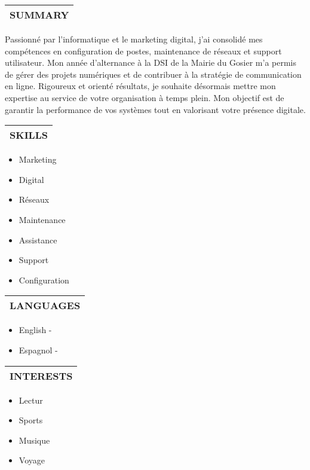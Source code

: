 \documentclass{article}
\makeatletter
\newcommand{\cvsection}[1]{%
  \par\bigskip
  \begin{tabular}{@{}p{\linewidth}}
  \textbf{\Large #1}\\[3pt]\hline
  \end{tabular}\medskip}
\makeatother
\begin{document}
\begin{paracol}{2}
\switchcolumn
\centering
{}


\cvsection{SUMMARY}
Passionné par l’informatique et le marketing digital, j’ai consolidé mes compétences en configuration de postes, maintenance de réseaux et support utilisateur. Mon année d’alternance à la DSI de la Mairie du Gosier m’a permis de gérer des projets numériques et de contribuer à la stratégie de communication en ligne. Rigoureux et orienté résultats, je souhaite désormais mettre mon expertise au service de votre organisation à temps plein. Mon objectif est de garantir la performance de vos systèmes tout en valorisant votre présence digitale.

\cvsection{SKILLS}
\begin{itemize}[leftmargin=*]
\item Marketing
\item Digital
\item Réseaux
\item Maintenance
\item Assistance
\item Support
\item Configuration\end{itemize}

\cvsection{LANGUAGES}
\begin{itemize}[leftmargin=*]
\item English - \textcolor{gray}{}
\item Espagnol - \textcolor{gray}{}\end{itemize}

\cvsection{INTERESTS}
\begin{itemize}[leftmargin=*]
\item Lectur
\item Sports
\item Musique
\item Voyage
\end{itemize}

\end{paracol}
\end{document}

